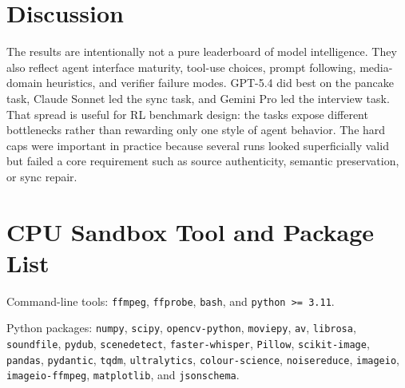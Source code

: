 \documentclass[11pt]{article}
\begin{document}
\section{Discussion}

The results are intentionally not a pure leaderboard of model intelligence. They also reflect agent interface maturity, tool-use choices, prompt following, media-domain heuristics, and verifier failure modes. GPT-5.4 did best on the pancake task, Claude Sonnet led the sync task, and Gemini Pro led the interview task. That spread is useful for RL benchmark design: the tasks expose different bottlenecks rather than rewarding only one style of agent behavior. The hard caps were important in practice because several runs looked superficially valid but failed a core requirement such as source authenticity, semantic preservation, or sync repair.

\appendix
\section{CPU Sandbox Tool and Package List}
\label{app:tools}

Command-line tools: \texttt{ffmpeg}, \texttt{ffprobe}, \texttt{bash}, and \texttt{python >= 3.11}.

Python packages: \texttt{numpy}, \texttt{scipy}, \texttt{opencv-python}, \texttt{moviepy}, \texttt{av}, \texttt{librosa}, \texttt{soundfile}, \texttt{pydub}, \texttt{scenedetect}, \texttt{faster-whisper}, \texttt{Pillow}, \texttt{scikit-image}, \texttt{pandas}, \texttt{pydantic}, \texttt{tqdm}, \texttt{ultralytics}, \texttt{colour-science}, \texttt{noisereduce}, \texttt{imageio}, \texttt{imageio-ffmpeg}, \texttt{matplotlib}, and \texttt{jsonschema}.
\end{document}
